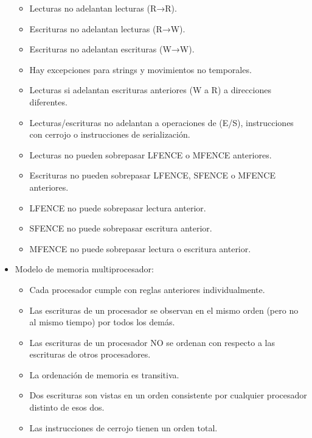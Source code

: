 \documentclass[12pt, twoside, openright]{report} %
\begin{document}
\begin{itemize}
\begin{itemize}
      \item
        Lecturas no adelantan lecturas (R→R).
      \item
        Escrituras no adelantan lecturas (R→W).
      \item
        Escrituras no adelantan escrituras (W→W).
      \item
        Hay excepciones para strings y movimientos no temporales.
      \item
        Lecturas si adelantan escrituras anteriores (W a R) a
        direcciones diferentes.
      \item
        Lecturas/escrituras no adelantan a operaciones de (E/S),
        instrucciones con cerrojo o instrucciones de serialización.
      \item
        Lecturas no pueden sobrepasar LFENCE o MFENCE anteriores.
      \item
        Escrituras no pueden sobrepasar LFENCE, SFENCE o MFENCE
        anteriores.
      \item
        LFENCE no puede sobrepasar lectura anterior.
      \item
        SFENCE no puede sobrepasar escritura anterior.
      \item
        MFENCE no puede sobrepasar lectura o escritura anterior.
      \end{itemize}
    \item
      Modelo de memoria multiprocesador:

      \begin{itemize}
      
      \item
        Cada procesador cumple con reglas anteriores individualmente.
      \item
        Las escrituras de un procesador se observan en el mismo orden
        (pero no al mismo tiempo) por todos los demás.
      \item
        Las escrituras de un procesador NO se ordenan con respecto a
        las escrituras de otros procesadores.
      \item
        La ordenación de memoria es transitiva.
      \item
        Dos escrituras son vistas en un orden consistente por
        cualquier procesador distinto de esos dos.
      \item
        Las instrucciones de cerrojo tienen un orden total.
      \end{itemize}
    \end{itemize}
\end{document}
